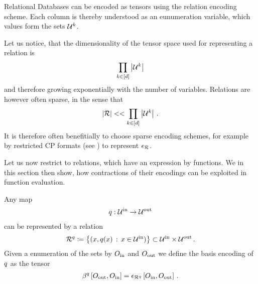 \begin{example}
    Relational Databases can be encoded as tensors using the relation encoding scheme.
    Each column is thereby understood as an eunumeration variable, which values form the sets $\mathcal{U}^{k}$.
\end{example}

Let us notice, that the dimensionality of the tensor space used for representing a relation is
\begin{align*}
    \prod_{k\in[d]} \left|\mathcal{U}^{k}\right|
\end{align*}
and therefore growing exponentially with the number of variables.
Relations are however often sparse, in the sense that
\begin{align*}
    \left|\mathcal{R}\right| << \prod_{k\in[d]} \left|\mathcal{U}^{k}\right| \, .
\end{align*}
It is therefore often benefitially to choose sparse encoding schemes, for example by restricted CP formats (see ) to represent $\epsilon_{\mathcal{R}}$.



Let us now restrict to relations, which have an expression by functions.
We in this section then show, how contractions of their encodings can be exploited in function evaluation.



\begin{definition}
    \label{def:functionRelationEncoding}
    Any map
    \begin{align*}
        q : \mathcal{U}^{\mathrm{in}} \rightarrow \mathcal{U}^{\mathrm{out}}
    \end{align*}
    can be represented by a relation
    \begin{align*}
        \mathcal{R}^{q} \coloneqq \left\{ (x,q(x) \, : \, x \in\mathcal{U}^{\mathrm{in}} )\right\} \subset \mathcal{U}^{\mathrm{in}} \times \mathcal{U}^{\mathrm{out}} \, .
    \end{align*}
    Given a enumeration of the sets by $O_{\mathrm{in}}$ and $O_{\mathrm{out}}$ we define the basis encoding of $q$ as the tensor
    \begin{align*}
        \beta^{q}\left[O_{\mathrm{out}},O_{\mathrm{in}}\right]
        = \epsilon_{\mathcal{R}^{q}}\left[O_{\mathrm{in}},O_{\mathrm{out}}\right]  \, .
    \end{align*}
\end{definition}

